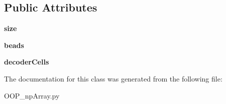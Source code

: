 \subsection*{Public Attributes}
\begin{DoxyCompactItemize}
\item 
\mbox{\label{class_o_o_p__np_array_1_1_well__np_array_a41208fa67f3c64e4047d745fb0e7d4d0}} 
{\bfseries size}
\item 
\mbox{\label{class_o_o_p__np_array_1_1_well__np_array_a9a8c256bed5cd50e3e5670c1f8d430a2}} 
{\bfseries beads}
\item 
\mbox{\label{class_o_o_p__np_array_1_1_well__np_array_ab6c127c23c6e613f7d32242742970a2f}} 
{\bfseries decoder\+Cells}
\end{DoxyCompactItemize}


The documentation for this class was generated from the following file\+:\begin{DoxyCompactItemize}
\item 
O\+O\+P\+\_\+np\+Array.\+py\end{DoxyCompactItemize}
